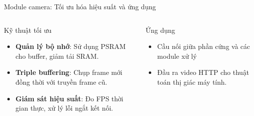 \begin{frame}{Module camera: Tối ưu hóa hiệu suất và ứng dụng}
    \begin{columns}[t]
        \begin{column}{0.48\textwidth}
            \begin{block}{Kỹ thuật tối ưu}
                \begin{itemize}
                    \item \textbf{Quản lý bộ nhớ}: Sử dụng PSRAM cho buffer, giảm tải SRAM.
                    \item \textbf{Triple buffering}: Chụp frame mới đồng thời với truyền frame cũ.
                    \item \textbf{Giám sát hiệu suất}: Đo FPS thời gian thực, xử lý lỗi ngắt kết nối.
                \end{itemize}
            \end{block}
        \end{column}
        \begin{column}{0.48\textwidth}
            \begin{block}{Ứng dụng}
                \begin{itemize}
                    \item Cầu nối giữa phần cứng và các module xử lý
                    \item Đầu ra video HTTP cho thuật toán thị giác máy tính.
                \end{itemize}
            \end{block}
        \end{column}
    \end{columns}
\end{frame}
